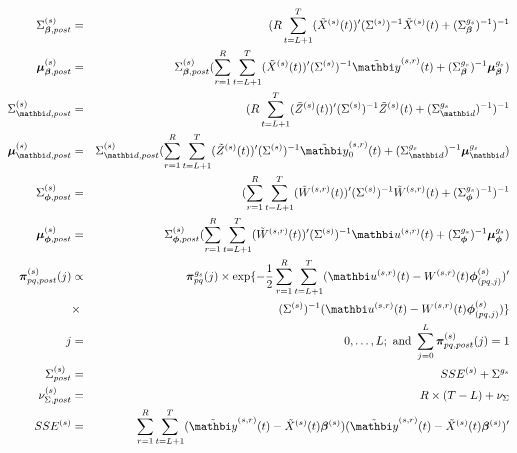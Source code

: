 \documentclass[12pt,titlepage,fleqn]{article}
\newcommand{\1}{{\bm 1}}
\newcommand{\vy}{\mathbi y}
\newcommand{\vu}{\mathbi u}
\newcommand{\vd}{\mathbi d}
\newcommand{\vbeta}{\boldsymbol \beta}
\newcommand{\vphi}{\boldsymbol \phi}
\newcommand{\vxi}{\boldsymbol \xi}
\newcommand{\vell}{\boldsymbol \ell}
\newcommand{\vmu}{\boldsymbol{\mu}}
\newcommand{\vpi}{\boldsymbol{\pi}}
\newcommand{\gs}{^{g_s}}
\newcommand{\s}{^{(s)}}
\newcommand{\sr}{^{(s,r)}}
\newcommand{\lik}{\mathcal{L}}
\newcommand{\half}{\frac{1}{2}}
\begin{document}
\begin{eqnarray}
 \nonumber
\Sigma_{\vbeta,post}\s&=& (R\sum_{t=L+1}^{T}(\tilde{X}\s(t))'(\Sigma\s)^{-1}\tilde{X}\s(t)+{\color{blue}(\Sigma_{\vbeta}\gs)}^{-1})^{-1} \\  \nonumber
\vmu_{\vbeta,post}\s &=& \Sigma_{\vbeta,post}\s(\sum_{r=1}^{R}\sum_{t=L+1}^{T}(\tilde{X}\s(t))'(\Sigma\s)^{-1}\tilde{\vy}\sr(t)+{\color{blue}(\Sigma_{\vbeta}\gs)^{-1}\vmu_{\vbeta}\gs})\\  \nonumber
\Sigma_{\vd,post}\s&=& (R\sum_{t=L+1}^{T}(\tilde{Z}\s(t))'(\Sigma\s)^{-1}\tilde{Z}\s(t)+{\color{blue}(\Sigma_{\vd}\gs)}^{-1})^{-1} \\  \nonumber
\vmu_{\vd,post}\s &=& \Sigma_{\vd,post}\s(\sum_{r=1}^{R}\sum_{t=L+1}^{T}(\tilde{Z}\s(t))'(\Sigma\s)^{-1}\tilde{\vy}_0\sr(t)+{\color{blue}(\Sigma_{\vd}\gs)^{-1} \vmu_{\vd}\gs})\\ \nonumber
\Sigma_{\vphi,post}\s&=& ({\color{blue}\sum_{r=1}^R}\sum_{t=L+1}^{T}(\tilde{W}\sr(t))'(\Sigma\s)^{-1}\tilde{W}\sr(t)+ {\color{blue}(\Sigma_{\vphi}\gs)}^{-1})^{-1} \\  \nonumber
\vmu_{\vphi,post}\s &=& \Sigma_{\vphi,post}\s(\sum_{r=1}^{R}\sum_{t=L+1}^{T}(\tilde{W}\sr(t))'(\Sigma\s)^{-1}\vu\sr(t)+ {\color{blue}(\Sigma_{\vphi}\gs)^{-1} \vmu_{\vphi}\gs})\\  \nonumber
\vpi_{pq, post}\s(j) &\propto& {\color{blue}\vpi_{pq}\gs(j)}\times \exp\{ -\half\sum_{r=1}^{R}\sum_{t=L+1}^{T}(\vu\sr(t)-W\sr(t)\vphi\s_{(pq,j)})' \\  \nonumber
&\times&(\Sigma\s)^{-1}(\vu\sr(t)-W\sr(t)\vphi\s_{(pq,j)})\}\\  \nonumber
j&=&0,\dots, L; ~\text{and } \sum_{j=0}^L \vpi_{pq, post}\s(j) = 1 \\  \nonumber
\Sigma_{post}\s&=& SSE\s + {\color{blue}\Sigma\gs}\\ \nonumber
\nu_{\Sigma,post}\s&=& R\times(T - L) +\nu_{\Sigma}\\
\label{SSE}
SSE\s &=& \sum_{r=1}^{R}\sum_{t=L+1}^{T}(\tilde{\vy}\sr(t) - \tilde{X}\s(t)\vbeta\s)(\tilde{\vy}\sr(t) - \tilde{X}\s(t)\vbeta\s)' 
\end{eqnarray}
\end{document}
